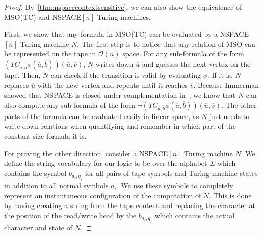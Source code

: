 \begin{proof}
    By~\cref{thm:nspacecontextsensitive}, we can also show the equivalence of \acs{MSO}(\acs{TC}) and \acs{NSPACE}$[n]$ Turing machines.

    First, we show that any formula in \acs{MSO}(\acs{TC}) can be evaluated by a \acs{NSPACE}$[n]$ Turing machine $N$.
    The first step is to notice that any relation of \acs{MSO} can be represented on the tape in $\mathcal{O}(n)$ space.
    For any sub-formula of the form $\left(TC_{\overline{a}, \overline{b}}\phi\left(\overline{a}, \overline{b}\right)\right)\left(\overline{u}, \overline{v}\right)$, $N$ writes down $\overline{u}$ and guesses the next vertex on the tape.
    Then, $N$ can check if the transition is valid by evaluating $\phi$.
    If it is, $N$ replaces $\overline{u}$ with the new vertex and repeats until it reaches $\overline{v}$.
    Because Immerman showed that \acs{NSPACE} is closed under complementation in~\cite{Immerman1988}, we know that $N$ can also compute any sub-formula of the form $\neg\left(TC_{\overline{a}, \overline{b}}\phi\left(\overline{a}, \overline{b}\right)\right)\left(\overline{u}, \overline{v}\right)$.
    The other parts of the formula can be evaluated easily in linear space, as $N$ just needs to write down relations when quantifying and remember in which part of the constant-size formula it is.

    \vspace{5mm}

    For proving the other direction, consider a \acs{NSPACE}$[n]$ Turing machine $N$.
    We define the string vocabulary for our logic to be over the alphabet $\Sigma$ which contains the symbol $b_{a_i, q_j}$ for all pairs of tape symbols and Turing machine states in addition to all normal symbols $a_i$.
    We use these symbols to completely represent an instantaneous configuration of the computation of $N$.
    This is done by having creating a string from the tape content and replacing the character at the position of the read/write head by the $b_{a_i, q_j}$ which contains the actual character and state of $N$.


\end{proof}
